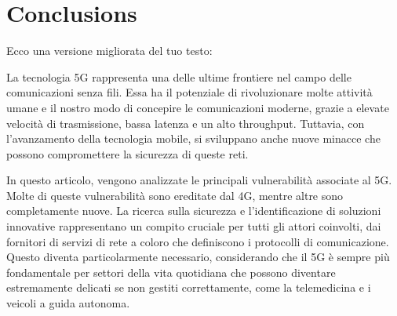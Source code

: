 \documentclass[english]{article}
\begin{document}
\section{Conclusions}

Ecco una versione migliorata del tuo testo:

La tecnologia 5G rappresenta una delle ultime frontiere nel campo delle
comunicazioni senza fili. Essa ha il potenziale di rivoluzionare molte attività
umane e il nostro modo di concepire le comunicazioni moderne, grazie a elevate
velocità di trasmissione, bassa latenza e un alto throughput. Tuttavia, con
l'avanzamento della tecnologia mobile, si sviluppano anche nuove minacce che
possono compromettere la sicurezza di queste reti.

In questo articolo, vengono analizzate le principali vulnerabilità associate al
5G. Molte di queste vulnerabilità sono ereditate dal 4G, mentre altre sono
completamente nuove. La ricerca sulla sicurezza e l'identificazione di
soluzioni innovative rappresentano un compito cruciale per tutti gli attori
coinvolti, dai fornitori di servizi di rete a coloro che definiscono i
protocolli di comunicazione. Questo diventa particolarmente necessario,
considerando che il 5G è sempre più fondamentale per settori della vita
quotidiana che possono diventare estremamente delicati se non gestiti
correttamente, come la telemedicina e i veicoli a guida autonoma.\appendix
\end{document}
